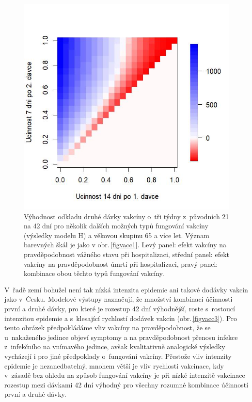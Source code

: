 \begin{figure}[ht]
\begin{center}
\begin{minipage}[m]{0.3\linewidth}
		\end{minipage}
		\begin{minipage}[m]{0.3\linewidth}
			\includegraphics[width=\textwidth]{pic/JDL_DIFF_mean_T.jpg}
		\end{minipage}
	\end{center}
	\caption{Výhodnost odkladu druhé dávky vakcíny o~tři týdny z~původních 21 na 42 dní pro několik dalších možných typů fungování vakcíny (výsledky modelu H) a věkovou skupinu 65 a více let. Význam barevných škál je jako v obr.\,\ref{figvacc1}. Levý panel: efekt vakcíny na pravděpodobnost vážného stavu při hospitalizaci, střední panel: efekt vakcíny na pravděpodobnost úmrtí při hospitalizaci, pravý panel: kombinace obou těchto typů fungování vakcíny.}
	\label{figvacc2}
\end{figure}

V~řadě zemí bohužel není tak nízká intenzita epidemie ani takové dodávky vakcín jako v~Česku. Modelové výstupy naznačují, že množství kombinací účinnosti první a druhé dávky, pro které je rozestup 42 dní výhodnější, roste s~rostoucí intenzitou epidemie a s~klesající rychlostí dodávek vakcín (obr.\,\ref{figvacc3}). Pro tento obrázek předpokládáme vliv vakcíny na pravděpodobnost, že se u~nakaženého jedince objeví symptomy a na pravděpodobnost přenosu infekce z~infekčního na vnímavého jedince, avšak kvalitativně analogické výsledky vycházejí i pro jiné předpoklady o~fungování vakcíny. Přestože vliv intenzity epidemie je nezanedbatelný, mnohem větší je vliv rychlosti vakcinace, kdy v~zásadě bez ohledu na způsob fungování vakcíny je při nízké intenzitě vakcinace rozestup mezi dávkami 42 dní výhodný pro všechny rozumné kombinace účinností první a druhé dávky.


